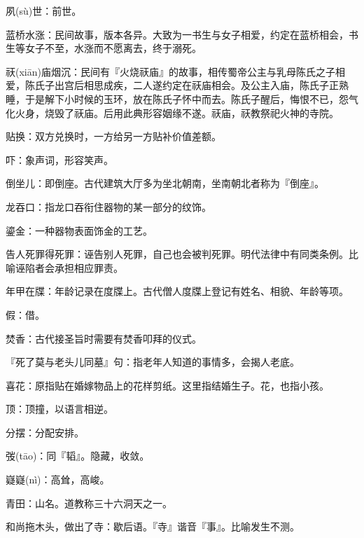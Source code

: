 \startbuffer[2183]
夙(sù)世：前世。
\stopbuffer


\startbuffer[2184]
蓝桥水涨：民间故事，版本各异。大致为一书生与女子相爱，约定在蓝桥相会，书生等女子不至，水涨而不愿离去，终于溺死。
\stopbuffer


\startbuffer[2185]
祆(xiān)庙烟沉：民间有『火烧祆庙』的故事，相传蜀帝公主与乳母陈氏之子相爱，陈氏子出宫后相思成疾，二人遂约定在祆庙相会。及公主入庙，陈氏子正熟睡，于是解下小时候的玉环，放在陈氏子怀中而去。陈氏子醒后，悔恨不已，怨气化火身，烧毁了祆庙。后用此典形容姻缘不遂。祆庙，祆教祭祀火神的寺院。
\stopbuffer


\startbuffer[2186]
贴换：双方兑换时，一方给另一方贴补价值差额。
\stopbuffer


\startbuffer[2187]
吓：象声词，形容笑声。
\stopbuffer


\startbuffer[2188]
倒坐儿：即倒座。古代建筑大厅多为坐北朝南，坐南朝北者称为『倒座』。
\stopbuffer


\startbuffer[2189]
龙吞口：指龙口吞衔住器物的某一部分的纹饰。
\stopbuffer


\startbuffer[2190]
鎏金：一种器物表面饰金的工艺。
\stopbuffer


\startbuffer[2191]
告人死罪得死罪：诬告别人死罪，自己也会被判死罪。明代法律中有同类条例。比喻诬陷者会承担相应罪责。
\stopbuffer


\startbuffer[2192]
年甲在牒：年龄记录在度牒上。古代僧人度牒上登记有姓名、相貌、年龄等项。
\stopbuffer


\startbuffer[2193]
假：借。
\stopbuffer


\startbuffer[2194]
焚香：古代接圣旨时需要有焚香叩拜的仪式。
\stopbuffer


\startbuffer[2195]
『死了莫与老头儿同墓』句：指老年人知道的事情多，会揭人老底。
\stopbuffer


\startbuffer[2196]
喜花：原指贴在婚嫁物品上的花样剪纸。这里指结婚生子。花，也指小孩。
\stopbuffer


\startbuffer[2197]
顶：顶撞，以语言相逆。
\stopbuffer


\startbuffer[2198]
分摆：分配安排。
\stopbuffer


\startbuffer[2199]
弢(tāo)：同『韬』。隐藏，收敛。
\stopbuffer


\startbuffer[2200]
嶷嶷(nì)：高耸，高峻。
\stopbuffer


\startbuffer[2201]
青田：山名。道教称三十六洞天之一。
\stopbuffer


\startbuffer[2202]
和尚拖木头，做出了寺：歇后语。『寺』谐音『事』。比喻发生不测。
\stopbuffer


